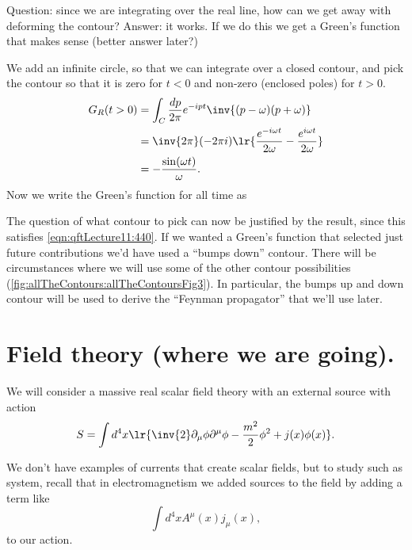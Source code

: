 Question: since we are integrating over the real line, how can we get away with deforming the contour?
Answer: it works.  If we do this we get a Green's function that makes sense (better answer later?)

We add an infinite circle, so that we can integrate over a closed contour, and pick the contour so that it is zero for \( t < 0 \) and non-zero (enclosed poles) for \( t > 0 \).
\begin{equation}\label{eqn:qftLecture11:640}
\begin{aligned}
G_R(t > 0)
&= \int_C \frac{dp}{2 \pi} e^{-i p t}
\inv{(p - \omega)(p + \omega)} \\
&=
\inv{2 \pi} (-2 \pi i) \lr{
   \frac{e^{-i \omega t}}{2 \omega}
   -
   \frac{e^{i \omega t}}{2 \omega}
} \\
&=
-\frac{\sin(\omega t)}{\omega}.
\end{aligned}
\end{equation}
Now we write the Green's function for all time as

The question of what contour to pick can now be justified by the result, since this satisfies \cref{eqn:qftLecture11:440}.  If we wanted a Green's function that selected just future contributions we'd have used a ``bumps down'' contour.  There will be circumstances where we will use some of the other contour possibilities (\cref{fig:allTheContours:allTheContoursFig3}).  In particular, the bumps up and down contour will be used to derive the ``Feynman propagator'' that we'll use later.

\section{Field theory (where we are going).}

We will consider a massive real scalar field theory with an external source with action
\begin{equation}\label{eqn:qftLecture11:680}
S = \int d^4 x \lr{
\inv{2} \partial_\mu \phi \partial^\mu \phi - \frac{m^2}{2} \phi^2 + j(x) \phi(x)
}.
\end{equation}

We don't have examples of currents that create scalar fields, but to study such as system, recall that
in electromagnetism we added sources to the field by adding a term like
\begin{equation}\label{eqn:qftLecture11:700}
\int d^4 x A^\mu(x) j_\mu(x),
\end{equation}
to our action.


